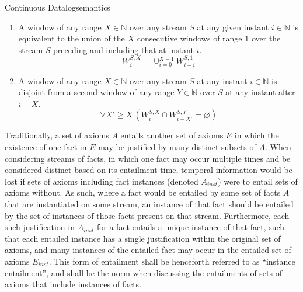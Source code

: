 \begin{nestedsection}{Continuous Datalog}{semantics}
\begin{enumerate}
\begin{equation*}
			\end{equation*}
		\item\label{axiom:continuous datalog: window composition}
			A window of any range ${X \in \mathbb{N}}$ over any stream $S$ at any given instant ${i \in \mathbb{N}}$ is equivalent to the union of the $X$ consecutive windows of range 1 over the stream $S$ preceding and including that at instant $i$.
			\begin{equation*}
				W^{S,X}_{i} = \mathop{\cup}_{i=0}^{X-1} W^{S,1}_{i-i}
			\end{equation*}
		\item\label{axiom:continuous datalog: window disjointness}
			A window of any range ${X \in \mathbb{N}}$ over any stream $S$ at any instant ${i \in \mathbb{N}}$ is disjoint from a second window of any range ${Y \in \mathbb{N}}$ over $S$ at any instant after ${i - X}$.
			\begin{equation*}
				\forall X' \geq X \, \left( W^{S,X}_{i} \cap W^{S,Y}_{i-X'} = \varnothing \right)
			\end{equation*}
		\setcounter{continuousDatalogAxioms}{\theenumi}
	\end{enumerate}

	Traditionally, a set of axioms $A$ entails another set of axioms $E$ in which the existence of one fact in $E$ may be justified by many distinct subsets of $A$.
	When considering streams of facts, in which one fact may occur multiple times and be considered distinct based on its entailment time, temporal information would be lost if sets of axioms including fact instances (denoted $A_{inst}$) were to entail sets of axioms without.
	As such, where a fact would be entailed by some set of facts $A$ that are instantiated on some stream, an instance of that fact should be entailed by the set of instances of those facts present on that stream.
	Furthermore, each such justification in $A_{inst}$ for a fact entails a unique instance of that fact, such that each entailed instance has a single justification within the original set of axioms, and many instances of the entailed fact may occur in the entailed set of axioms $E_{inst}$.
	This form of entailment shall be henceforth referred to as ``instance entailment'', and shall be the norm when discussing the entailments of sets of axioms that include instances of facts.
	

\end{nestedsection}
